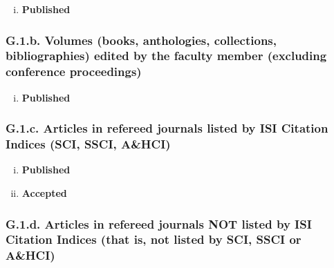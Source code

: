 \documentclass[12pt]{article}
\begin{document}
\begin{enumerate}[i)]
\item {\bf Published}  %
\end{enumerate}

\subsubsection*{G.1.b. Volumes (books, anthologies, collections, bibliographies) edited by the faculty member (excluding conference proceedings)}


\begin{enumerate}[i)]
\item {\bf Published}  %
\end{enumerate}



\subsubsection*{G.1.c. Articles in refereed journals listed by ISI Citation Indices (SCI, SSCI, A\&HCI)}


\begin{enumerate}[i)]
\item {\bf Published} %

\item {\bf Accepted} %
\end{enumerate}

\subsubsection*{G.1.d. Articles in refereed journals NOT listed by ISI Citation Indices (that is, not listed by SCI, SSCI or A\&HCI)}
 
\end{document}

